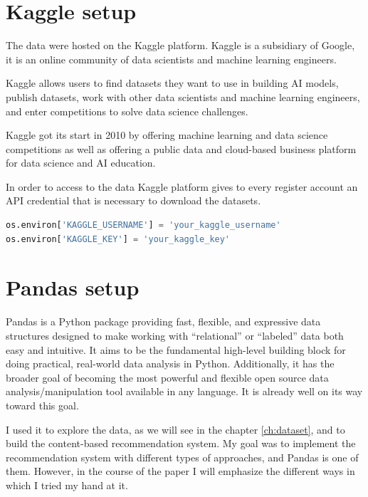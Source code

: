\documentclass[12pt,english]{report}
\begin{document}
\section{Kaggle setup}
The data were hosted on the Kaggle platform. Kaggle is a subsidiary of Google, it is an online community of data scientists and machine learning engineers.\par
Kaggle allows users to find datasets they want to use in building AI models, publish datasets, work with other data scientists and machine learning engineers, and enter competitions to solve data science challenges.\par
Kaggle got its start in 2010 by offering machine learning and data science competitions as well as offering a public data and cloud-based business platform for data science and AI education. \cite{kaggle}\par
In order to access to the data Kaggle platform gives to every register account an API credential that is necessary to download the datasets.
\begin{lstlisting}[language={Python},label={lst:kagglecredential},caption={API Credential for accessing the data}]
os.environ['KAGGLE_USERNAME'] = 'your_kaggle_username'
os.environ['KAGGLE_KEY'] = 'your_kaggle_key'
\end{lstlisting}
\section{Pandas setup}
Pandas is a Python package providing fast, flexible, and expressive data structures designed to make working with “relational” or “labeled” data both easy and intuitive. It aims to be the fundamental high-level building block for doing practical, real-world data analysis in Python. Additionally, it has the broader goal of becoming the most powerful and flexible open source data analysis/manipulation tool available in any language. It is already well on its way toward this goal. \cite{pandas}\par
I used it to explore the data, as we will see in the chapter \ref{ch:dataset}, and to build the content-based recommendation system. My goal was to implement the recommendation system with different types of approaches, and Pandas is one of them. However, in the course of the paper I will emphasize the different ways in which I tried my hand at it.
\end{document}
